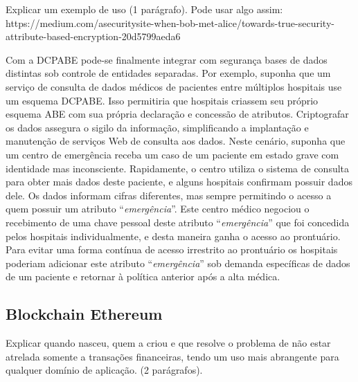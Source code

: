 \documentclass[a4paper,11pt]{article}
\begin{document}
{\color{ForestGreen}Explicar um exemplo de uso (1 parágrafo). Pode usar algo assim: https://medium.com/asecuritysite-when-bob-met-alice/towards-true-security-attribute-based-encryption-20d5799aeda6}

Com a DCPABE pode-se finalmente integrar com segurança bases de dados distintas sob controle de entidades separadas.
Por exemplo, suponha que um serviço de consulta de dados médicos de pacientes entre múltiplos hospitais use um esquema DCPABE.
Isso permitiria que hospitais criassem seu próprio esquema ABE com sua própria declaração e concessão de atributos.
Criptografar os dados assegura o sigilo da informação, simplificando a implantação e manutenção de serviços Web de consulta aos dados.
Neste cenário, suponha que um centro de emergência receba um caso de um paciente em estado grave com identidade mas inconsciente.
Rapidamente, o centro utiliza o sistema de consulta para obter mais dados deste paciente, e alguns hospitais confirmam possuir dados dele.
Os dados informam cifras diferentes, mas sempre permitindo o acesso a quem possuir um atributo ``\emph{emergência}''.
Este centro médico negociou o recebimento de uma chave pessoal deste atributo ``\emph{emergência}'' que foi concedida pelos hospitais individualmente, e desta maneira ganha o acesso ao prontuário.
Para evitar uma forma contínua de acesso irrestrito ao prontuário os hospitais poderiam adicionar este atributo ``\emph{emergência}''  sob demanda específicas de dados de um paciente e retornar à política anterior após a alta médica.

\subsection{Blockchain Ethereum}

{\color{ForestGreen}Explicar quando nasceu, quem a criou e que resolve o problema de não estar atrelada somente a transações financeiras, tendo um uso mais abrangente para qualquer domínio de aplicação. (2 parágrafos).}
\end{document}
